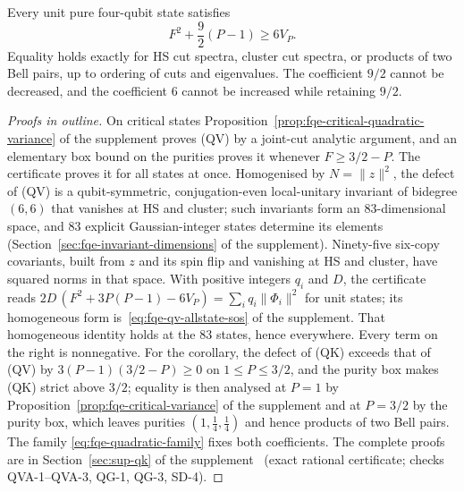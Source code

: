 \begin{corollary}
\label{thm:fqe-quadratic-variance}
Every unit pure four-qubit state satisfies
\[
\boxed{\qquad F^2+\frac92(P-1)\ge6V_P.\qquad}
\tag{QK}\label{eq:fqe-quadratic-variance-proved}
\]
Equality holds exactly for HS cut spectra, cluster cut spectra, or products
of two Bell pairs, up to ordering of cuts and eigenvalues.
The coefficient $9/2$ cannot be decreased, and the coefficient $6$ cannot
be increased while retaining $9/2$.
\end{corollary}
\begin{proof}[Proofs in outline]
On critical states Proposition~\ref{prop:fqe-critical-quadratic-variance} of the supplement
proves (QV) by a joint-cut analytic argument, and an elementary box bound on the purities proves it whenever
$F\ge3/2-P$. The certificate proves it for all states at once. Homogenised by $N=\lVert z\rVert^2$, the
defect of (QV) is a qubit-symmetric, conjugation-even local-unitary invariant of bidegree $(6,6)$ that
vanishes at HS and cluster; such invariants form an $83$-dimensional space, and $83$ explicit
Gaussian-integer states determine its elements (Section~\ref{sec:fqe-invariant-dimensions} of the supplement).
Ninety-five six-copy covariants, built from $z$ and its spin flip and vanishing at HS and cluster, have squared
norms in that space. With positive integers $q_i$ and $D$, the certificate reads
$2D\,(F^2+3P(P-1)-6V_P)=\sum_iq_i\lVert\Phi_i\rVert^2$ for unit states; its homogeneous
form is~\eqref{eq:fqe-qv-allstate-sos} of the supplement. That homogeneous identity holds at the $83$ states, hence everywhere.
Every term on the right is nonnegative.
For the corollary, the defect of (QK) exceeds that of (QV) by $3(P-1)(3/2-P)\ge0$ on $1\le P\le3/2$, and the
purity box makes (QK) strict above $3/2$; equality is then analysed at $P=1$ by
Proposition~\ref{prop:fqe-critical-variance} of the supplement and at $P=3/2$ by the purity box, which leaves purities
$(1,\tfrac14,\tfrac14)$ and hence products of two Bell pairs. The family \eqref{eq:fqe-quadratic-family} fixes both coefficients.
The complete proofs are in Section~\ref{sec:sup-qk} of the supplement~\cite{Companion}
(exact rational certificate; checks QVA-1--QVA-3, QG-1, QG-3, SD-4).
\end{proof}
